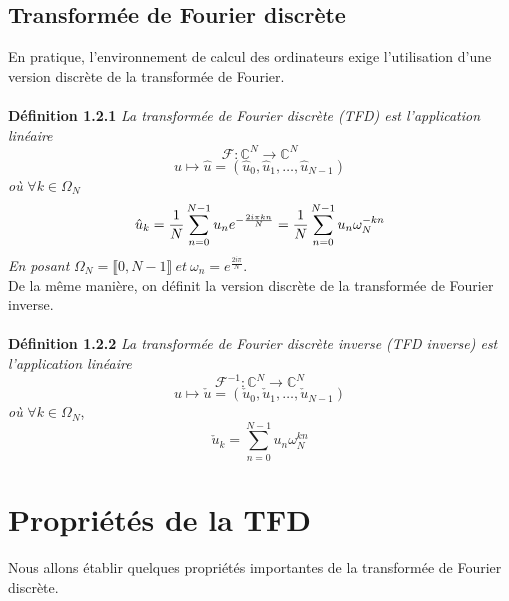 \documentclass[12pt]{article}
\begin{document}
\subsection{Transformée de Fourier discrète}
En pratique, l'environnement de calcul des ordinateurs exige l'utilisation d'une version discrète de la transformée de Fourier.\\\\
\textbf{Définition 1.2.1}
\textit{La transformée de Fourier discrète (TFD) est l'application linéaire}
\begin{equation*}
\mathcal{F}:\mathbb{C}^N\rightarrow\mathbb{C}^N
\end{equation*}
\begin{equation*}
u\mapsto\hat{u}=(\hat{u}_0,\hat{u}_1,\ldots,\hat{u}_{N-1})
\end{equation*}
\textit{où} $\forall k\in\Omega_N$
\begin{equation}
\hat{u}_k=\frac{1}{N}\sum_{n=0}^{N-1} u_ne^{-\frac{2i\pi kn}{N}}=\frac{1}{N}\sum_{n=0}^{N-1} u_n\omega_N^{-kn}\\
\end{equation}
\textit{En posant} $\Omega_N=\llbracket 0,N-1\rrbracket ~et~\omega_n=e^{\frac{2i\pi}{N}}$.\\
De la même manière, on définit la version discrète de la  transformée de Fourier inverse.\\\\
\textbf{Définition 1.2.2}
\textit{La transformée de Fourier discrète inverse (TFD inverse) est l'application linéaire}
\begin{equation*}
\mathcal{F}^{-1}:\mathbb{C}^N\rightarrow\mathbb{C}^N
\end{equation*}
\begin{equation*}
u\mapsto\check{u}=(\check{u}_0,\check{u}_1,\ldots,\check{u}_{N-1})
\end{equation*}
\textit{où} $\forall k\in\Omega_N$,
\begin{equation}
\check{u}_k=\sum_{n=0}^{N-1}u_n\omega_N^{kn}
\end{equation}
\section{Propriétés de la TFD}
Nous allons établir quelques propriétés importantes de la transformée de Fourier discrète.
\end{document}
